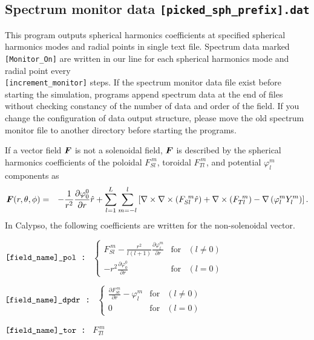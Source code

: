 \subsection{Spectrum monitor data {\tt [picked\_sph\_prefix].dat}}
This program outputs spherical harmonics coefficients at specified spherical harmonics modes and radial points in single text file. Spectrum data marked \verb|[Monitor_On]| are written in our line for each spherical harmonics mode and radial point every \\
\verb|[increment_monitor]| steps. If the spectrum monitor data file exist before starting the simulation, programs append spectrum data at the end of files without checking constancy of the number of data and order of the field. If you change the configuration of data output structure, please move the old spectrum monitor file to another directory before starting the programs.

If a vector field $\mbox{\boldmath$F$}$ is not a solenoidal field, $\mbox{\boldmath$F$}$ is described by the spherical harmonics coefficients of the poloidal $F_{Sl}^{\ m}$, toroidal $F_{Tl}^{\ m}$, and potential $\varphi_{l}^{m}$ components as
\begin{eqnarray}
\mbox{\boldmath$F$}(r, \theta, \phi) & = &  - \frac{1}{r^{2}}\frac{\partial \varphi_{0}^{0}}{\partial r} \hat{r}
 + \sum_{l=1}^{L} \sum_{m=-l}^{l} 
\left[\nabla \times \nabla \times \left( F_{Sl}^{\ m} \hat{r} \right) +  \nabla \times \left(F_{Tl}^{\ m}\right)
 - \nabla \left(\varphi_{l}^{m} Y_{l}^{m} \right)\right].
\nonumber
\end{eqnarray}
In Calypso, the following coefficients are written for the non-solenoidal vector.
\begin{description}
\item{\tt  $\verb|[field_name]_pol|$ : }
 $\left\{\begin{array}{ccr}
\displaystyle{
F_{Sl}^{\ m} - \frac{r^{2}}{l \left(l+1\right)} \frac{\partial \varphi_{l}^{m}}{\partial r} }
& \mbox{for} & \left (l \ne 0 \right)\\
\displaystyle{
 -r^{2} \frac{\partial \varphi_{0}^{0}}{\partial r}
} & \mbox{for} & \left (l = 0 \right)
\end{array}
\right.$
\item{\tt  $\verb|[field_name]_dpdr|$ : } 
$
\left\{
\begin{array}{ccr}
\displaystyle{
\frac{\partial F_{Sl}^{\ m}}{\partial r} - \varphi_{l}^{m}}
 & \mbox{for} & \left (l \ne 0 \right)\\
 0 & \mbox{for} & \left (l = 0 \right)
\end{array}
\right. $
\item{\tt  $\verb|[field_name]_tor|$ : }  $F_{Tl}^{\ m}$
\end{description}


